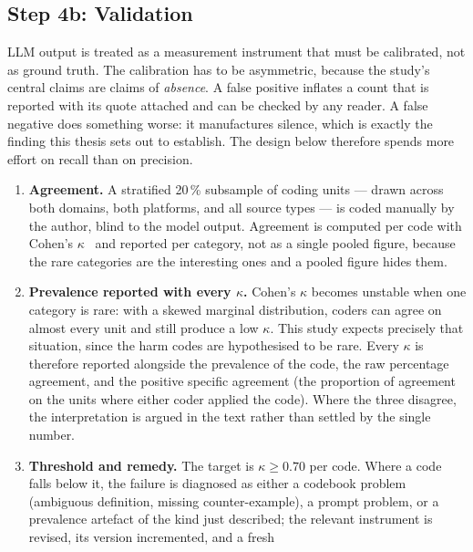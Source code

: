 \subsection{Step 4b: Validation}
\label{sec:validation}

LLM output is treated as a measurement instrument that must be calibrated, not
as ground truth. The calibration has to be asymmetric, because the study's
central claims are claims of \emph{absence}. A false positive inflates a count
that is reported with its quote attached and can be checked by any reader. A
false negative does something worse: it manufactures silence, which is exactly
the finding this thesis sets out to establish. The design below therefore spends
more effort on recall than on precision.

\begin{enumerate}[leftmargin=*,itemsep=3pt]
  \item \textbf{Agreement.} A stratified 20\,\% subsample of coding units ---
        drawn across both domains, both platforms, and all source types --- is
        coded manually by the author, blind to the model output. Agreement is
        computed per code with Cohen's $\kappa$~\parencite{cohen1960coefficient}
        and reported per category, not as a single pooled figure, because the
        rare categories are the interesting ones and a pooled figure hides them.
  \item \textbf{Prevalence reported with every $\kappa$.} Cohen's $\kappa$
        becomes unstable when one category is rare: with a skewed marginal
        distribution, coders can agree on almost every unit and still produce a
        low $\kappa$. This study expects precisely that situation, since the
        harm codes are hypothesised to be rare. Every $\kappa$ is therefore
        reported alongside the prevalence of the code, the raw percentage
        agreement, and the positive specific agreement (the proportion of
        agreement on the units where either coder applied the code). Where the
        three disagree, the interpretation is argued in the text rather than
        settled by the single number.
  \item \textbf{Threshold and remedy.} The target is $\kappa \geq 0.70$ per
        code. Where a code falls below it, the failure is diagnosed as either a
        codebook problem (ambiguous definition, missing counter-example), a
        prompt problem, or a prevalence artefact of the kind just described; the
        relevant instrument is revised, its version incremented, and a fresh

\end{enumerate}
